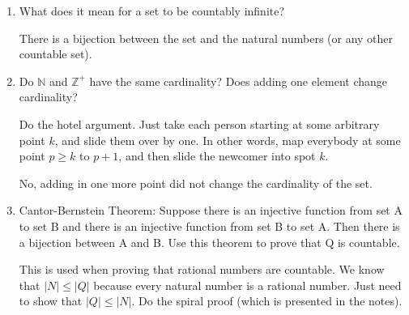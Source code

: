 \question 
\begin{enumerate}[label=(\alph*.)]
\item
What does it mean for a set to be countably infinite? 
\begin{solution}
There is a bijection between the set and the natural numbers (or any other countable set).
\end{solution}

\item
Do $\mathbb{N}$ and $\mathbb{Z}^+$ have the same cardinality? Does adding one element change cardinality?
\begin{solution}
Do the hotel argument. Just take each person starting at some arbitrary point $k$, and slide them over by one. In other words, map everybody at some point $p \ge k$ to $p + 1$, and then slide the newcomer into spot $k$.

No, adding in one more point did not change the cardinality of the set.
\end{solution}
\item
Cantor-Bernstein Theorem: Suppose there is an injective function from set A to set B and there is an injective function from set B to set A. Then there is a bijection between A and B.
Use this theorem to prove that Q is countable.
\begin{solution}
This is used when proving that rational numbers are countable. 
We know that $|N| \le |Q|$ because every natural number is a rational number.
Just need to show that $|Q| \le |N|$. Do the spiral proof (which is presented in the notes).
\end{solution}

\end{enumerate}